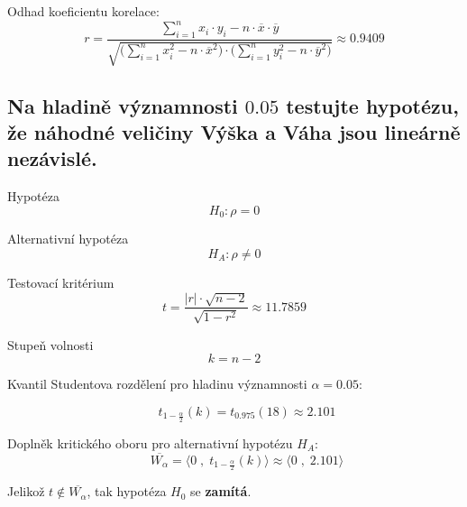 \begin{compactitem}
    \item Odhad koeficientu korelace:
    $${\displaystyle r = \frac{\sum\limits_{i=1}^n x_i \cdot y_i - n \cdot \overline{x} \cdot \overline{y}} {\sqrt{ \bigg( \sum\limits_{i=1}^n x_i^2 - n \cdot \overline{x}^2\bigg) \cdot \bigg( \sum\limits_{i=1}^n y_i^2 - n \cdot \overline{y}^2 \bigg)}} \approx 0.9409}$$
\end{compactitem}


\subsection{Na hladině významnosti $0.05$ testujte hypotézu, že náhodné veličiny Výška a Váha jsou lineárně nezávislé.}

\begin{compactitem}
    \item Hypotéza
    $${\displaystyle H_0 : \rho = 0}$$

    \item Alternativní hypotéza
    $${\displaystyle H_A : \rho \neq 0}$$

    \item Testovací kritérium
    $${\displaystyle t = \frac{|r| \cdot \sqrt{n - 2}}{\sqrt{1 - r^2}} \approx 11.7859}$$

    \item Stupeň volnosti
    $${\displaystyle k = n - 2}$$

    \item Kvantil Studentova rozdělení pro hladinu významnosti
    ${\displaystyle \alpha = 0.05}$:

    $${\displaystyle \qquad t_{1 - \frac{\alpha}{2}}(k) = t_{0.975}(18) \approx 2.101}$$

    \item Doplněk kritického oboru pro alternativní hypotézu ${\displaystyle H_{A}}$:
    $${\displaystyle \qquad \overline{W_\alpha} = \big\langle 0 \;,\; t_{1 - \frac{\alpha}{2}}(k) \big\rangle \approx \big\langle 0 \;,\; 2.101 \big\rangle}$$

    \item Jelikož ${\displaystyle t \notin \overline{W_\alpha}}$, tak hypotéza ${\displaystyle H_0}$ se \textbf{zamítá}.
\end{compactitem}


